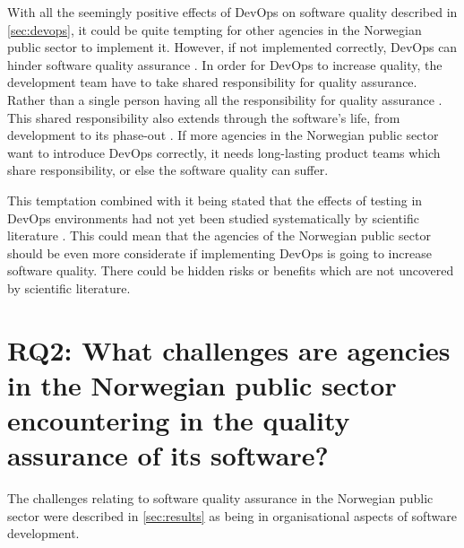 With all the seemingly positive effects of DevOps on software quality described in \autoref{sec:devops}, it could be quite tempting for other agencies in the Norwegian public sector to implement it. However, if not implemented correctly, DevOps can hinder software quality assurance \cite{dsc_2019}. In order for DevOps to increase quality, the development team have to take shared responsibility for quality assurance. Rather than a single person having all the responsibility for quality assurance \cite{dsc_2019}. This shared responsibility also extends through the software's life, from development to its phase-out \cite{dsc_2019}. If more agencies in the Norwegian public sector want to introduce DevOps correctly, it needs long-lasting product teams which share responsibility, or else the software quality can suffer.


This temptation combined with it being stated that the effects of testing in DevOps environments had not yet been studied systematically by scientific literature \cite{dsc_2019}\cite{ja_2016}. This could mean that the agencies of the Norwegian public sector should be even more considerate if implementing DevOps is going to increase software quality. There could be hidden risks or benefits which are not uncovered by scientific literature.


\section{RQ2: What challenges are agencies in the Norwegian public sector encountering in the quality assurance of its software?}
The challenges relating to software quality assurance in the Norwegian public sector were described in \autoref{sec:results} as being in organisational aspects of software development.

